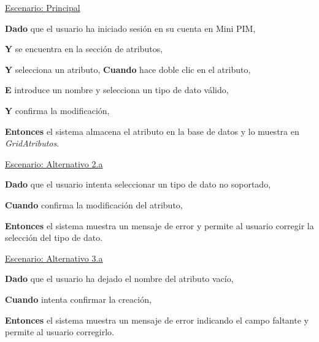 \underline{Escenario: Principal}\par
\vspace{0.15cm}
\textbf{Dado} que el usuario ha iniciado sesión en su cuenta en Mini PIM,\par
\textbf{Y} se encuentra en la sección de atributos,\par
\textbf{Y} selecciona un atributo,
\textbf{Cuando} hace doble clic en el atributo,\par
\textbf{E} introduce un nombre y selecciona un tipo de dato válido,\par
\textbf{Y} confirma la modificación,\par
\textbf{Entonces} el sistema almacena el atributo en la base de datos y lo muestra en \textit{GridAtributos}.\par
\vspace{0.20cm}

\underline{Escenario: Alternativo 2.a}\par
\vspace{0.15cm}
\textbf{Dado} que el usuario intenta seleccionar un tipo de dato no soportado,\par
\textbf{Cuando} confirma la modificación del atributo,\par
\textbf{Entonces} el sistema muestra un mensaje de error y permite al usuario corregir la selección del tipo de dato.\par
\vspace{0.20cm}

\underline{Escenario: Alternativo 3.a}\par
\vspace{0.15cm}
\textbf{Dado} que el usuario ha dejado el nombre del atributo vacío,\par
\textbf{Cuando} intenta confirmar la creación,\par
\textbf{Entonces} el sistema muestra un mensaje de error indicando el campo faltante y permite al usuario corregirlo.\par
\vspace{0.20cm}


